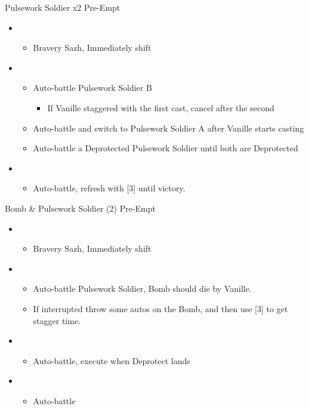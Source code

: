 \begin{multicols}{2}
\begin{battle}{Pulsework Soldier x2 Pre-Empt}
\begin{itemize}
    \item \second
    \begin{itemize}
        \item Bravery Sazh, Immediately shift
    \end{itemize}
    \item \third
    \begin{itemize}
        \item Auto-battle Pulsework Soldier B
        \begin{itemize}
            \item If Vanille staggered with the first cast, cancel after the second
        \end{itemize}
        \item Auto-battle and switch to Pulsework Soldier A after Vanille starts casting
        \item Auto-battle a Deprotected Pulsework Soldier until both are Deprotected
    \end{itemize}
    \item \first
    \begin{itemize}
        \item Auto-battle, refresh with [3] until victory.
    \end{itemize}
\end{itemize}
\end{battle}

\begin{battle}{Bomb \& Pulsework Soldier (2) Pre-Empt}
\begin{itemize}
    \item \second
    \begin{itemize}
        \item Bravery Sazh, Immediately shift
    \end{itemize}
    \item \first
    \begin{itemize}
        \item Auto-battle Pulsework Soldier, Bomb should die by Vanille.
        \item If interrupted throw some autos on the Bomb, and then use [3] to get stagger time.
    \end{itemize}
    \item \third
    \begin{itemize}
        \item Auto-battle, execute when Deprotect lands
    \end{itemize}
    \item \first
    \begin{itemize}
        \item Auto-battle
    \end{itemize}
\end{itemize}
\end{battle}



\end{multicols}

